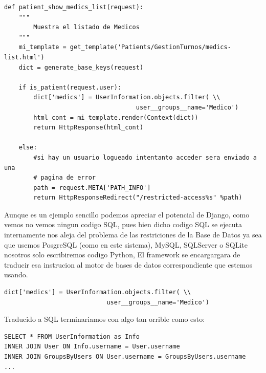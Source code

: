 \begin{lstlisting}[style=Python]
def patient_show_medics_list(request):
    """
        Muestra el listado de Medicos
    """
    mi_template = get_template('Patients/GestionTurnos/medics-list.html')
    dict = generate_base_keys(request)

    if is_patient(request.user):
        dict['medics'] = UserInformation.objects.filter( \\
                                    user__groups__name='Medico')
        html_cont = mi_template.render(Context(dict))
        return HttpResponse(html_cont)

    else:
        #si hay un usuario logueado intentanto acceder sera enviado a una
        # pagina de error
        path = request.META['PATH_INFO']
        return HttpResponseRedirect("/restricted-access%s" %path)
\end{lstlisting}

\vspace{0.1cm}

Aunque es un ejemplo sencillo podemos apreciar el potencial de Django, como vemos
no vemos ningun codigo SQL, pues bien dicho codigo SQL se ejecuta internamente
nos aleja del problema de las restriciones de la Base de Datos ya sea que usemos
PosgreSQL (como en este sistema), MySQL, SQLServer o SQLite nosotros
solo escribiremos codigo Python, El framework se encargargara de traducir esa
instrucion al motor de bases de datos correspondiente que estemos usando.\\[0.2cm]

\begin{lstlisting}[style=consola]
dict['medics'] = UserInformation.objects.filter( \\
                            user__groups__name='Medico')
\end{lstlisting}

\vspace{0.1cm}

Traducido a SQL terminariamos con algo tan orrible como esto:\\[0.1cm]

\begin{lstlisting}[style=consola]
SELECT * FROM UserInformation as Info
INNER JOIN User ON Info.username = User.username
INNER JOIN GroupsByUsers ON User.username = GroupsByUsers.username
...
\end{lstlisting}

\vspace{0.1cm}

